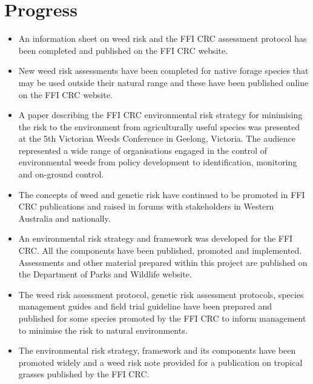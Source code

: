 \documentclass[version=last, 
    paper=a4, %
    10pt, %
    usenames,
    dvipsnames, 
    oneside, %
    headings=openany, %
    DIV=15 %
]{scrbook}
\begin{document}
\section*{Progress}
\begin{itemize}
\itemsep1pt\parskip0pt
\item
  An information sheet on weed risk and the FFI CRC assessment protocol
  has been completed and published on the FFI CRC website.
\item
  New weed risk assessments have been completed for native forage
  species that may be used outside their natural range and these have
  been published online on the FFI CRC website.
\item
  A paper describing the FFI CRC environmental risk strategy for
  minimising the risk to the environment from agriculturally useful
  species was presented at the 5th Victorian Weeds Conference in
  Geelong, Victoria. The audience represented a wide range of
  organisations engaged in the control of environmental weeds from
  policy development to identification, monitoring and on-ground
  control.
\item
  The concepts of weed and genetic risk have continued to be promoted in
  FFI CRC publications and raised in forums with stakeholders in Western
  Australia and nationally.
\item
  An environmental risk strategy and framework was developed for the FFI
  CRC. All the components have been published, promoted and implemented.
  Assessments and other material prepared within this project are
  published on the Department of Parks and Wildlife website.
\item
  The weed risk assessment protocol, genetic risk assessment protocols,
  species management guides and field trial guideline have been prepared
  and published for some species promoted by the FFI CRC to inform
  management to minimise the risk to natural environments.
\item
  The environmental risk strategy, framework and its components have
  been promoted widely and a weed risk note provided for a publication
  on tropical grasses published by the FFI CRC.
\end{itemize}
\end{document}
